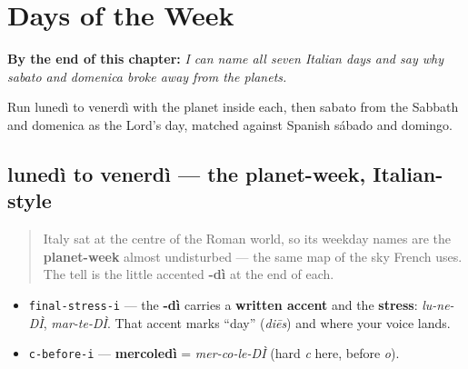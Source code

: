 
\chapter{Days of the Week}
\label{ch:it-days-of-the-week}

\begin{chapteropening}
\textbf{By the end of this chapter:} \emph{I can name all seven Italian days and say why sabato and domenica broke away from the planets.}

Run lunedì to venerdì with the planet inside each, then sabato from the Sabbath and domenica as the Lord's day, matched against Spanish sábado and domingo.
\end{chapteropening}

\section[lunedì, martedì, mercoledì, giovedì …]{lunedì to venerdì — the planet-week, Italian-style}

\label{lesson:IT-C07-giorni-1}



\begin{quote}
Italy sat at the centre of the Roman world, so its weekday names are the \textbf{planet-week} almost undisturbed — the same map of the sky French uses. The tell is the little accented \textbf{-dì} at the end of each.
\end{quote}

\begin{sounds}
\begin{itemize}
\raggedright
  \item \texttt{final-stress-i} — the \textbf{-dì} carries a \textbf{written accent} and the \textbf{stress}: \emph{lu-ne-DÌ}, \emph{mar-te-DÌ}. That accent marks \textquotedblleft{}day\textquotedblright{} (\emph{diēs}) and where your voice lands.
  \item \texttt{c-before-i} — \textbf{mercoledì} = \emph{mer-co-le-DÌ} (hard \emph{c} here, before \emph{o}).
\end{itemize}
\end{sounds}

